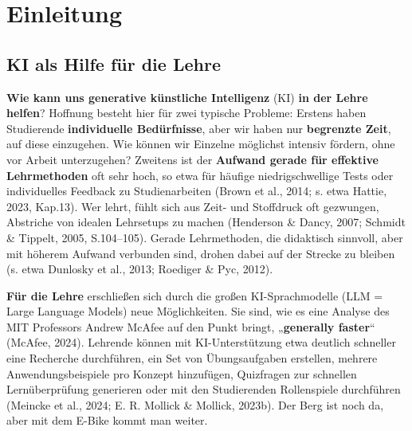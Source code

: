 \documentclass[
  ngerman,
  letterpaper,
  DIV=11]{scrreprt}
\begin{document}

\chapter{Einleitung}\label{sec-einleitung}

\section{KI als Hilfe für die Lehre}\label{sec-ki-hilfe}

\textbf{Wie kann uns generative künstliche Intelligenz} (KI) \textbf{in
der Lehre helfen}? Hoffnung besteht hier für zwei typische Probleme:
Erstens haben Studierende \textbf{individuelle Bedürfnisse}, aber wir
haben nur \textbf{begrenzte Zeit}, auf diese einzugehen. Wie können wir
Einzelne möglichst intensiv fördern, ohne vor Arbeit unterzugehen?
Zweitens ist der \textbf{Aufwand gerade für effektive Lehrmethoden} oft
sehr hoch, so etwa für häufige niedrigschwellige Tests oder
individuelles Feedback zu Studienarbeiten (Brown et al., 2014; s. etwa
Hattie, 2023, Kap.13). Wer lehrt, fühlt sich aus Zeit- und Stoffdruck
oft gezwungen, Abstriche von idealen Lehrsetups zu machen (Henderson \&
Dancy, 2007; Schmidt \& Tippelt, 2005, S.104--105). Gerade Lehrmethoden,
die didaktisch sinnvoll, aber mit höherem Aufwand verbunden sind, drohen
dabei auf der Strecke zu bleiben (s. etwa Dunlosky et al., 2013;
Roediger \& Pyc, 2012).

\begin{tcolorbox}[enhanced jigsaw, left=2mm, bottomrule=.15mm, arc=.35mm, rightrule=.15mm, colframe=quarto-callout-tip-color-frame, coltitle=black, colback=white, toprule=.15mm, toptitle=1mm, colbacktitle=quarto-callout-tip-color!10!white, title=\textcolor{quarto-callout-tip-color}{\faLightbulb}\hspace{0.5em}{Schnelles Brainstorming mit der KI}, opacitybacktitle=0.6, leftrule=.75mm, bottomtitle=1mm, titlerule=0mm, opacityback=0, breakable]

\end{tcolorbox}

\textbf{Für die Lehre} erschließen sich durch die großen
KI-Sprachmodelle (LLM = Large Language Models) neue Möglichkeiten. Sie
sind, wie es eine Analyse des MIT Professors Andrew McAfee auf den Punkt
bringt, „\textbf{generally faster}`` (McAfee, 2024). Lehrende können mit
KI-Unterstützung etwa deutlich schneller eine Recherche durchführen, ein
Set von Übungsaufgaben erstellen, mehrere Anwendungsbeispiele pro
Konzept hinzufügen, Quizfragen zur schnellen Lernüberprüfung generieren
oder mit den Studierenden Rollenspiele durchführen (Meincke et al.,
2024; E. R. Mollick \& Mollick, 2023b). Der Berg ist noch da, aber mit
dem E-Bike kommt man weiter.
\end{document}
